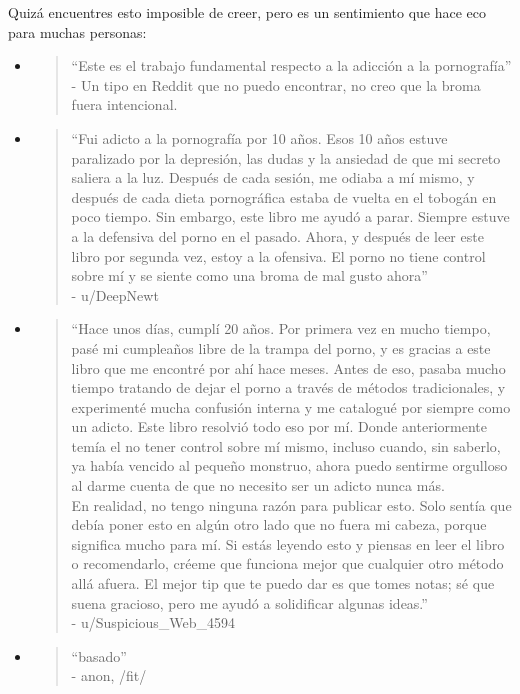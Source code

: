 \documentclass[
  spanish,
  openany]{book}
\begin{document}
Quizá encuentres esto imposible de creer, pero es un sentimiento que hace eco para muchas personas:

\begin{itemize}
\item
  \begin{quote}
  ``Este es el trabajo fundamental respecto a la adicción a la pornografía''\\
  - Un tipo en Reddit que no puedo encontrar, no creo que la broma fuera intencional.
  \end{quote}
\item
  \begin{quote}
  ``Fui adicto a la pornografía por 10 años. Esos 10 años estuve paralizado por la depresión, las dudas y la ansiedad de que mi secreto saliera a la luz. Después de cada sesión, me odiaba a mí mismo, y después de cada dieta pornográfica estaba de vuelta en el tobogán en poco tiempo. Sin embargo, este libro me ayudó a parar. Siempre estuve a la defensiva del porno en el pasado. Ahora, y después de leer este libro por segunda vez, estoy a la ofensiva. El porno no tiene control sobre mí y se siente como una broma de mal gusto ahora''\\
  - u/DeepNewt
  \end{quote}
\item
  \begin{quote}
  ``Hace unos días, cumplí 20 años. Por primera vez en mucho tiempo, pasé mi cumpleaños libre de la trampa del porno, y es gracias a este libro que me encontré por ahí hace meses. Antes de eso, pasaba mucho tiempo tratando de dejar el porno a través de métodos tradicionales, y experimenté mucha confusión interna y me catalogué por siempre como un adicto. Este libro resolvió todo eso por mí. Donde anteriormente temía el no tener control sobre mí mismo, incluso cuando, sin saberlo, ya había vencido al pequeño monstruo, ahora puedo sentirme orgulloso al darme cuenta de que no necesito ser un adicto nunca más.\\
  En realidad, no tengo ninguna razón para publicar esto. Solo sentía que debía poner esto en algún otro lado que no fuera mi cabeza, porque significa mucho para mí. Si estás leyendo esto y piensas en leer el libro o recomendarlo, créeme que funciona mejor que cualquier otro método allá afuera. El mejor tip que te puedo dar es que tomes notas; sé que suena gracioso, pero me ayudó a solidificar algunas ideas.''\\
  - u/Suspicious\_Web\_4594
  \end{quote}
\item
  \begin{quote}
  ``basado''\\
  - anon, /fit/
  \end{quote}
\end{itemize}
\end{document}
